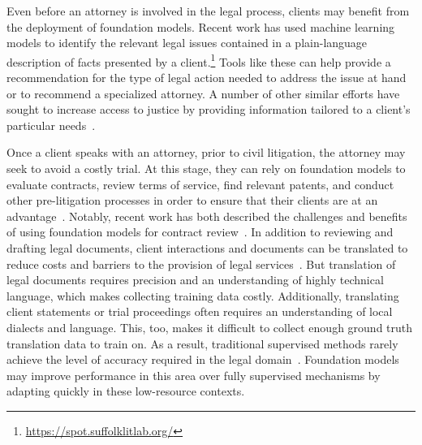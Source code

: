 Even before an attorney is involved in the legal process, clients may benefit from the deployment of foundation models. Recent work has used machine learning models to identify the relevant legal issues contained in a plain-language description of facts presented by a client.\footnote{\url{https://spot.suffolklitlab.org/}} Tools like these can help provide a recommendation for the type of legal action needed to address the issue at hand or to recommend a specialized attorney. A number of other similar efforts have sought to increase access to justice by providing information tailored to a client's particular needs~\citep{cabral2012using,brescia2014embracing,queudot2020improving,westermann2019using}.

Once a client speaks with an attorney, prior to civil litigation, the attorney may seek to avoid a costly trial. At this stage, they can rely on foundation models to evaluate contracts, review terms of service, find relevant patents, and conduct other pre-litigation processes in order to ensure that their clients are at an advantage~\citep{betts2017dawn,elwany2019bert,lippi2019claudette,lee2019patentbert,hendrycks2021cuad,hegel2021law}. Notably, recent work has both described the challenges and benefits of using foundation models for contract review~\citep{leivaditi2020benchmark,hegel2021law,hendrycks2021cuad}. In addition to reviewing and drafting legal documents, client interactions and documents can be translated to reduce costs and barriers to the provision of legal services~\citep{cuellar_2019}. But translation of legal documents requires precision and an understanding of highly technical language, which makes collecting training data costly. Additionally, translating client statements or trial proceedings often requires an understanding of local dialects and language. This, too, makes it difficult to collect enough ground truth translation data to train on. As a result, traditional supervised methods rarely achieve the level of accuracy required in the legal domain~\citep{vieira2020understanding}. Foundation models may improve performance in this area over fully supervised mechanisms by adapting quickly in these low-resource contexts. 

